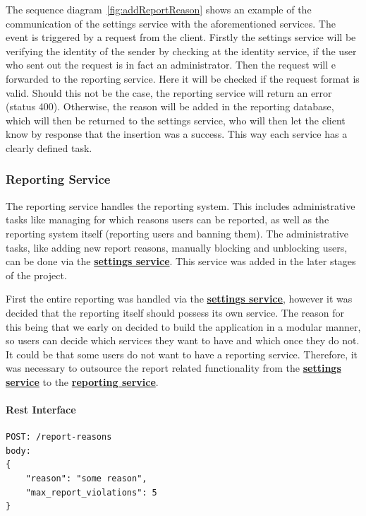 The sequence diagram~\ref{fig:addReportReason} shows an example of the communication of the settings service with the
aforementioned services.
The event is triggered by a request from the client.
Firstly the settings service will be verifying the identity of the sender by checking at the identity service, if the
user who sent out the request is in fact an administrator.
Then the request will e forwarded to the reporting service.
Here it will be checked if the request format is valid.
Should this not be the case, the reporting service will return an error (status 400).
Otherwise, the reason will be added in the reporting database, which will then be returned to the settings service,
who will then let the client know by response that the insertion was a success.
This way each service has a clearly defined task.

\subsubsection{Reporting Service}\label{subsubsec:reportingSer}

The reporting service handles the reporting system.
This includes administrative tasks like managing for which reasons users can be reported, as well as the reporting
system itself (reporting users and banning them).
The administrative tasks, like adding new report reasons, manually blocking and unblocking users, can be done via the
\hyperref[subsubsec:settingsSer]{\textbf{settings service}}.
This service was added in the later stages of the project.

First the entire reporting was handled via the \hyperref[subsubsec:settingsSer]{\textbf{settings service}}, however it
was decided that the reporting itself should possess its own service.
The reason for this being that we early on decided to build the application in a modular manner, so users can decide
which services they want to have and which once they do not.
It could be that some users do not want to have a reporting service.
Therefore, it was necessary to outsource the report related functionality from the
\hyperref[subsubsec:settingsSer]{\textbf{settings service}} to the
\hyperref[subsubsec:reportingSer]{\textbf{reporting service}}.

\paragraph{Rest Interface}
\begin{lstlisting}[label={lst:lstlisting7}]
POST: /report-reasons
body:
{
    "reason": "some reason",
    "max_report_violations": 5
}
\end{lstlisting}

